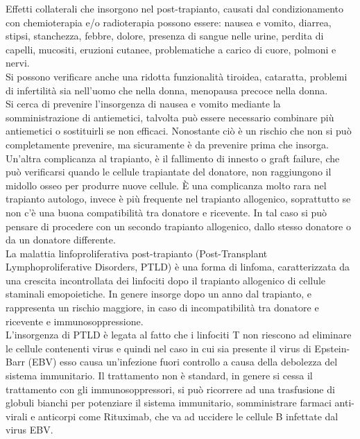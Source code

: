 Effetti collaterali che insorgono nel post-trapianto, causati dal condizionamento con chemioterapia e/o radioterapia 
possono essere: nausea e vomito, diarrea, stipsi, stanchezza, febbre, dolore, presenza di sangue nelle urine, 
perdita di capelli, mucositi, eruzioni cutanee, problematiche a carico di cuore, polmoni e nervi\cite{LLSBLOOD}.\\
Si possono verificare anche una ridotta funzionalità tiroidea, cataratta, problemi di infertilità sia nell’uomo 
che nella donna, menopausa precoce nella donna.\\
Si cerca di prevenire l’insorgenza di nausea e vomito mediante la somministrazione di antiemetici, talvolta 
può essere necessario combinare più antiemetici o sostituirli se non efficaci. 
Nonostante ciò è un rischio che non si può completamente prevenire, ma sicuramente è da prevenire prima che insorga\cite{STEMCELLS}.\\

Un’altra complicanza al trapianto, è il fallimento di innesto o graft failure, che può verificarsi quando le cellule 
trapiantate del donatore, non raggiungono il midollo osseo per produrre nuove cellule. È una complicanza molto rara 
nel trapianto autologo, invece è più frequente nel trapianto allogenico, soprattutto se non c’è una buona 
compatibilità tra donatore e ricevente. In tal caso si può pensare di procedere con un secondo trapianto allogenico, 
dallo stesso donatore o da un donatore differente\cite{LLSBLOOD}.\\

La malattia linfoproliferativa post-trapianto (Post-Transplant Lymphoproliferative Disorders, PTLD) è una forma di 
linfoma, caratterizzata da una crescita incontrollata dei linfociti dopo il trapianto allogenico di cellule staminali 
emopoietiche. In genere insorge dopo un anno dal trapianto, e rappresenta un rischio maggiore, in caso di incompatibilità 
tra donatore e ricevente e immunosoppressione\cite{STEMCELLS}.\\
L’insorgenza di PTLD è legata al fatto che i linfociti T non riescono ad eliminare le cellule contenenti 
virus e quindi nel caso in cui sia presente il virus di Epstein-Barr (EBV) esso causa un’infezione fuori controllo 
a causa della debolezza del sistema immunitario. Il trattamento non è standard, in genere si cessa il trattamento 
con gli immunosoppressori, si può ricorrere ad una trasfusione di globuli bianchi per potenziare il sistema 
immunitario, somministrare farmaci anti-virali e anticorpi come Rituximab, che va ad uccidere le cellule B infettate 
dal virus EBV\cite{STEMCELLS}.


